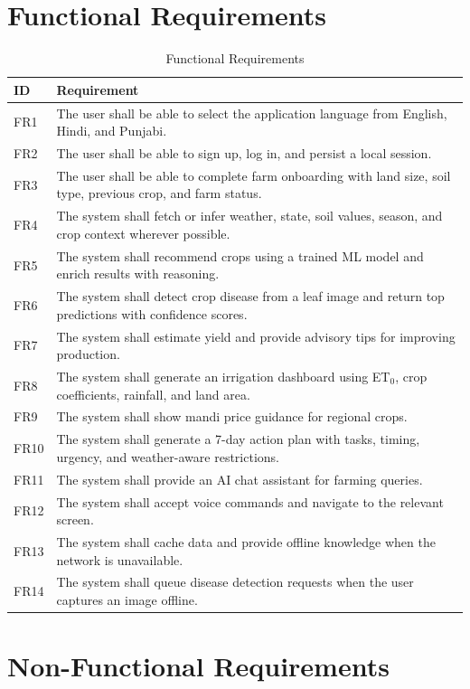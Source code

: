\documentclass[12pt,a4paper]{report}
\begin{document}
\section{Functional Requirements}

\begin{longtable}{p{2.2cm}p{11cm}}
\caption{Functional Requirements}\\
\toprule
\textbf{ID} & \textbf{Requirement} \\
\midrule
FR1 & The user shall be able to select the application language from English, Hindi, and Punjabi. \\
FR2 & The user shall be able to sign up, log in, and persist a local session. \\
FR3 & The user shall be able to complete farm onboarding with land size, soil type, previous crop, and farm status. \\
FR4 & The system shall fetch or infer weather, state, soil values, season, and crop context wherever possible. \\
FR5 & The system shall recommend crops using a trained ML model and enrich results with reasoning. \\
FR6 & The system shall detect crop disease from a leaf image and return top predictions with confidence scores. \\
FR7 & The system shall estimate yield and provide advisory tips for improving production. \\
FR8 & The system shall generate an irrigation dashboard using ET$_0$, crop coefficients, rainfall, and land area. \\
FR9 & The system shall show mandi price guidance for regional crops. \\
FR10 & The system shall generate a 7-day action plan with tasks, timing, urgency, and weather-aware restrictions. \\
FR11 & The system shall provide an AI chat assistant for farming queries. \\
FR12 & The system shall accept voice commands and navigate to the relevant screen. \\
FR13 & The system shall cache data and provide offline knowledge when the network is unavailable. \\
FR14 & The system shall queue disease detection requests when the user captures an image offline. \\
\bottomrule
\end{longtable}

\section{Non-Functional Requirements}
\end{document}

